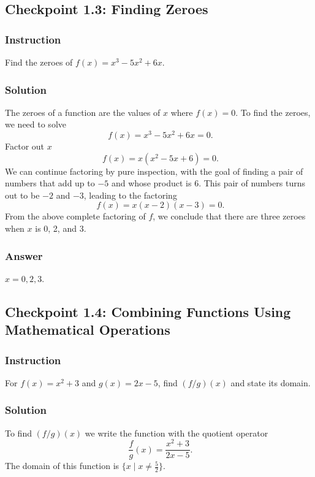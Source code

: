 \documentclass[11pt, letterpaper, oneside]{memoir}
\begin{document}
\subsection*{Checkpoint 1.3: Finding Zeroes}

\subsubsection*{Instruction}

Find the zeroes of $ f(x) = x^3 - 5x^2 + 6x $.

\subsubsection*{Solution}

The zeroes of a function are the values of $ x $ where $ f(x) = 0 $. To find the zeroes, we need to solve
$$ \phantom{.}
f(x) = x^3 - 5x^2 + 6x = 0
.$$
Factor out $ x $
$$ \phantom{.}
f(x) = x(x^2 - 5x + 6) = 0
.$$
We can continue factoring by pure inspection, with the goal of finding a pair of numbers that add up to $ -5 $ and whose product is $ 6 $. This pair of numbers turns out to be $ -2 $ and $ -3 $, leading to the factoring
$$ \phantom{.}
f(x) = x(x - 2)(x - 3) = 0
.$$
From the above complete factoring of $ f $, we conclude that there are three zeroes when $ x $ is 0, 2, and 3.

\subsubsection{Answer}

$ x = 0, 2, 3 $.

\subsection*{Checkpoint 1.4: Combining Functions Using Mathematical Operations}

\subsubsection{Instruction}

For $ f(x) = x^2 + 3 $ and $ g(x) = 2x - 5 $, find $ (f/g)(x) $ and state its domain.

\subsubsection{Solution}

To find $ (f/g)(x) $ we write the function with the quotient operator
$$ \phantom{.}
\frac{f}{g}(x) = \frac{x^2 + 3}{2x - 5}.
$$
The domain of this function is $ \{ x \mid x \ne \frac{5}{2} \} $.
\end{document}
